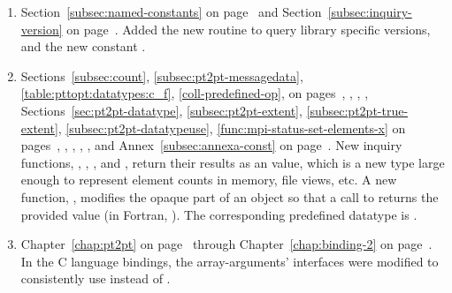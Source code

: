 \begin{enumerate}
\item 
Section~\ref{subsec:named-constants} on page~\pageref{subsec:named-constants} and 
Section~\ref{subsec:inquiry-version} on page~\pageref{subsec:inquiry-version}. 
\newline 
Added the new routine  
to query library specific versions,
and the new constant .

\item 
Sections~\ref{subsec:count}, \ref{subsec:pt2pt-messagedata},
\ref{table:pttopt:datatypes:c_f}, \ref{coll-predefined-op}, 
on pages~\pageref{subsec:count}, \pageref{subsec:pt2pt-messagedata},
\pageref{table:pttopt:datatypes:c_f}, \pageref{coll-predefined-op},
Sections~\ref{sec:pt2pt-datatype}, %
\ref{subsec:pt2pt-extent}, %
\ref{subsec:pt2pt-true-extent}, %
\ref{subsec:pt2pt-datatypeuse}, %
\ref{func:mpi-status-set-elements-x} %
on pages~\pageref{sec:pt2pt-datatype}, %
\pageref{subsec:pt2pt-extent}, %
\pageref{subsec:pt2pt-true-extent}, %
\pageref{subsec:pt2pt-datatypeuse}, %
\pageref{func:mpi-status-set-elements-x}, %
and
Annex~\ref{subsec:annexa-const} on page~\pageref{subsec:annexa-const}.
\newline 
New inquiry functions, , ,
, and , return their results
as an  value, which is a new type large enough to represent element
counts in memory, file views, etc. A new function, ,
modifies the opaque part of an  object so that a call to 
returns the provided  value (in Fortran, ).
The corresponding predefined datatype is .  

\item 
Chapter~\ref{chap:pt2pt} on page~\pageref{chap:pt2pt} through
Chapter~\ref{chap:binding-2} on page~\pageref{chap:binding-2}.
\newline 
In the C language bindings, the array-arguments' interfaces were modified to consistently 
use \code{{[}{]}} instead of \code{*}.


\end{enumerate}
